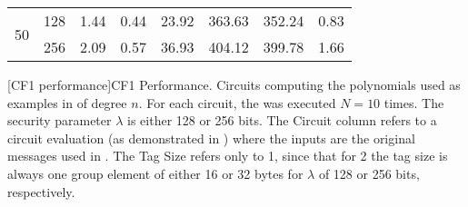 \begin{table}[htb]
{\begin{tabular}{|r|r|rrrr|r|r|}
\multicolumn{1}{|r|}{\multirow{2}{*}{50}}  & 128       & 1.44                       & 0.44                     & 23.92                   & 363.63     & 352.24                    & 0.83       \\
\multicolumn{1}{|r|}{}                     & 256       & 2.09                       & 0.57                     & 36.93                   & 404.12     & 399.78                    & 1.66       \\ \hline
\end{tabular}
}
[CF1 performance]{CF1 Performance. Circuits computing the
  polynomials used as examples in 
  of degree $n$. For each circuit, the  was
  executed $N = 10$ times. The security parameter $\lambda$ is either 128 or
  256 bits. The Circuit column refers to a circuit evaluation (as demonstrated
  in ) where the inputs are the original messages used in
  \Auth. The Tag Size refers only to 1, since
  that for 2 the tag size is always one group
element of either 16 or 32 bytes for $\lambda$ of 128 or 256 bits,
respectively.}\label{tab:cf-perf-pinocchio}
\end{table}
